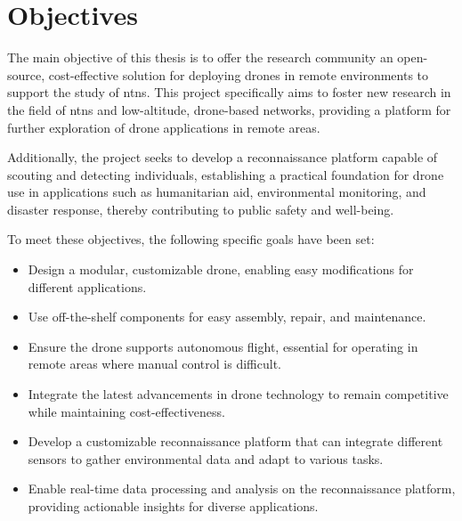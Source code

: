 \chapter{Objectives}\label{ch:objectives}

The main objective of this thesis is to offer the research community an open-source, cost-effective solution for deploying drones in remote environments to support the study of \glspl{ntn}. This project specifically aims to foster new research in the field of \glspl{ntn} and low-altitude, drone-based networks, providing a platform for further exploration of drone applications in remote areas.

Additionally, the project seeks to develop a reconnaissance platform capable of scouting and detecting individuals, establishing a practical foundation for drone use in applications such as humanitarian aid, environmental monitoring, and disaster response, thereby contributing to public safety and well-being.

To meet these objectives, the following specific goals have been set:

\begin{itemize}
  \item Design a modular, customizable drone, enabling easy modifications for different applications.

  \item Use off-the-shelf components for easy assembly, repair, and maintenance.

  \item Ensure the drone supports autonomous flight, essential for operating in remote areas where manual control is difficult.

  \item Integrate the latest advancements in drone technology to remain competitive while maintaining cost-effectiveness.

  \item Develop a customizable reconnaissance platform that can integrate different sensors to gather environmental data and adapt to various tasks.

  \item Enable real-time data processing and analysis on the reconnaissance platform, providing actionable insights for diverse applications.
\end{itemize}
